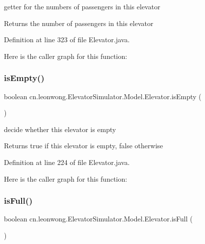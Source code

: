 getter for the numbers of passengers in this elevator \begin{DoxyReturn}{Returns}
the number of passengers in this elevator 
\end{DoxyReturn}


Definition at line 323 of file Elevator.\+java.

Here is the caller graph for this function\+:
\mbox{\label{classcn_1_1leonwong_1_1_elevator_simulator_1_1_model_1_1_elevator_a524eaa48c98d600d587c9e81f47e477b}} 
\subsubsection{\texorpdfstring{is\+Empty()}{isEmpty()}}
{\footnotesize\ttfamily boolean cn.\+leonwong.\+Elevator\+Simulator.\+Model.\+Elevator.\+is\+Empty (\begin{DoxyParamCaption}{ }\end{DoxyParamCaption})}

decide whether this elevator is empty \begin{DoxyReturn}{Returns}
true if this elevator is empty, false otherwise 
\end{DoxyReturn}


Definition at line 224 of file Elevator.\+java.

Here is the caller graph for this function\+:
\mbox{\label{classcn_1_1leonwong_1_1_elevator_simulator_1_1_model_1_1_elevator_a6abc5ffe66c8be2d11493fb9d9a2022f}} 
\subsubsection{\texorpdfstring{is\+Full()}{isFull()}}
{\footnotesize\ttfamily boolean cn.\+leonwong.\+Elevator\+Simulator.\+Model.\+Elevator.\+is\+Full (\begin{DoxyParamCaption}{ }\end{DoxyParamCaption})}

